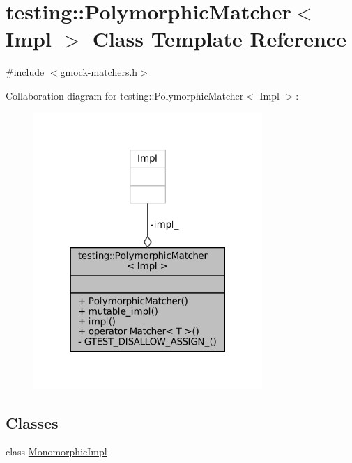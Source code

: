 \hypertarget{classtesting_1_1PolymorphicMatcher}{}\section{testing\+:\+:Polymorphic\+Matcher$<$ Impl $>$ Class Template Reference}
\label{classtesting_1_1PolymorphicMatcher}


{\ttfamily \#include $<$gmock-\/matchers.\+h$>$}



Collaboration diagram for testing\+:\+:Polymorphic\+Matcher$<$ Impl $>$\+:
\nopagebreak
\begin{figure}[H]
\begin{center}
\leavevmode
\includegraphics[width=246pt]{classtesting_1_1PolymorphicMatcher__coll__graph}
\end{center}
\end{figure}
\subsection*{Classes}
\begin{DoxyCompactItemize}
\item 
class \hyperlink{classtesting_1_1PolymorphicMatcher_1_1MonomorphicImpl}{Monomorphic\+Impl}
\end{DoxyCompactItemize}

